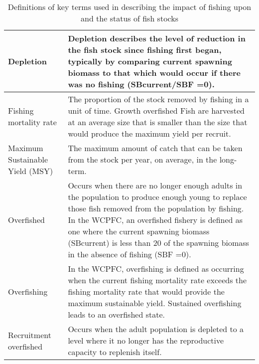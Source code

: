 \begin{table}[h]
\begin{tabular}{ | p{5cm} | p{10cm} |}
\hline
Depletion & Depletion describes the level of reduction in the fish stock since fishing
first began, typically by comparing current spawning biomass to that
which would occur if there was no fishing (SBcurrent/SBF =0). \\ \hline
Fishing mortality rate & The proportion of the stock removed by fishing in a unit of time.
Growth overfished Fish are harvested at an average size that is smaller than the size that
would produce the maximum yield per recruit. \\ \hline
Maximum Sustainable Yield (MSY) & The maximum amount of catch that can be taken from the stock per
year, on average, in the long-term. \\ \hline
Overfished & Occurs when there are no longer enough adults in the population to
produce enough young to replace those fish removed from the population
by fishing. In the WCPFC, an overfished fishery is defined as one
where the current spawning biomass (SBcurrent) is less than 20 of the
spawning biomass in the absence of fishing (SBF =0). \\ \hline
Overfishing & In the WCPFC, overfishing is defined as occurring when the current
fishing mortality rate exceeds the fishing mortality rate that would
provide the maximum sustainable yield. Sustained overfishing leads to
an overfished state. \\ \hline
Recruitment overfished & Occurs when the adult population is depleted to a level where it no longer has the reproductive capacity to replenish itself. \\
\hline
\end{tabular}
\caption{Definitions of key terms used in describing the impact of fishing upon and the status of fish stocks} 
\end{table}